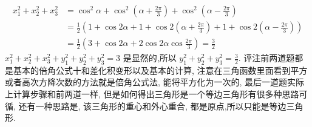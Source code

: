$$
\begin{aligned}
x_1^2+x_2^2+x_3^2 & =\cos ^2 \alpha+\cos ^2\left(\alpha+\frac{2 \pi}{3}\right)+\cos ^2\left(\alpha-\frac{2 \pi}{3}\right) \\
& =\frac{1}{2}\left(1+\cos 2 \alpha+1+\cos 2\left(\alpha+\frac{2 \pi}{3}\right)+1+\cos 2\left(\alpha-\frac{2 \pi}{3}\right)\right) \\
& =\frac{1}{2}\left(3+\cos 2 \alpha+2 \cos 2 \alpha \cos \frac{2 \pi}{3}\right)=\frac{3}{2}
\end{aligned}
$$
$x_1^2+x_2^2+x_3^2+y_1^2+y_2^2+y_3^2=3$ 是显然的,所以 $y_1^2+y_2^2+y_3^2=\frac{3}{2}$.
评注前两道题都是基本的倍角公式十和差化积变形以及基本的计算, 注意在三角函数里面看到平方或者高次方降次数的方法就是倍角公式法, 能将平方化为一次的, 最后一道题实际上计算步骤和前两道一样, 但是如何得出三角形是一个等边三角形有很多种思路可循, 还有一种思路是, 该三角形的重心和外心重合, 都是原点,所以只能是等边三角形.




